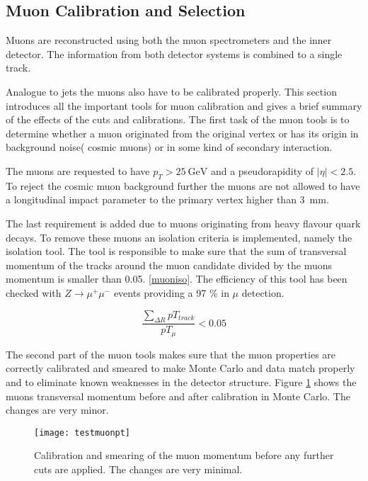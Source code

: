 \subsection{Muon Calibration and Selection}

Muons are reconstructed using both the muon spectrometers and the inner detector. The information from both detector systems is combined to a single track.

Analogue to jets the muons also have to be calibrated properly. This section introduces all the important tools for muon calibration and gives a brief summary of the effects of the cuts and calibrations.
The first task of the muon tools is to determine whether a muon originated from the original vertex or has its origin in background noise( cosmic muons) or in some kind of secondary interaction.

The muons are requested to have $p_T > \SI{25}{\GeV}$ and a pseudorapidity of $|\eta| < \num{2.5}$. To reject the cosmic muon background further the muons are not allowed to have a longitudinal impact parameter to the primary vertex higher than \SI{3}{\mm}. 

The last requirement is added due to muons originating from heavy flavour quark decays.
To remove these muons an isolation criteria is implemented, namely the isolation tool. The tool is responsible to make sure that the sum of transversal momentum of the tracks around the muon candidate divided by the muons momentum is smaller than \num{0.05}. \ref{muoniso}. The efficiency of this tool has been checked with $Z \rightarrow \mu^+ \mu^-$ events providing a \num{97} \% in $\mu$ detection.

\begin{equation}
\frac{\sum_{\Delta R}pT_{track}}{pT_{\mu}} < 0.05
\label{muoniso}
\end{equation}


The second part of the muon tools makes sure that the muon properties are correctly calibrated and smeared to make Monte Carlo and data match properly and to eliminate known weaknesses in the detector structure. Figure \ref{fig:testmuonpt} shows the muons transversal momentum before and after calibration in Monte Carlo. The changes are very minor.

\begin{figure}[h]
\centering
\texttt{[image: testmuonpt]}
\caption[Calibration and Smearing of the muon momentum]{Calibration and smearing of the muon momentum before any further cuts are applied. The changes are very minimal.}
\label{fig:testmuonpt}
\end{figure}

